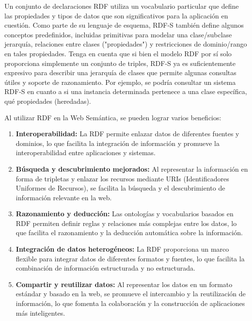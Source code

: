 \documentclass[12pt]{article}
\begin{document}
Un conjunto de declaraciones RDF utiliza un vocabulario particular que define las propiedades y tipos de datos que son significativos para la aplicación en cuestión. Como parte de su lenguaje de esquema, RDF-S también define algunos conceptos predefinidos, incluidas primitivas para modelar una clase/subclase jerarquía, relaciones entre clases ("propiedades") y restricciones de dominio/rango en tales propiedades. Tenga en cuenta que si bien el modelo RDF por sí solo proporciona simplemente un conjunto de triples, RDF-S ya es suficientemente expresivo para describir una jerarquía de clases que permite algunas consultas útiles y soporte de razonamiento. Por ejemplo, se podría consultar un sistema RDF-S en cuanto a si una instancia determinada pertenece a una clase específica, qué propiedades (heredadas). \citep{ref10}

Al utilizar RDF en la Web Semántica, se pueden lograr varios beneficios:
\citep{ref46}
\begin{enumerate}
    \item {
        
        \textbf{Interoperabilidad:} La RDF permite enlazar datos de diferentes fuentes y dominios, lo que facilita la integración de información y promueve la interoperabilidad entre aplicaciones y sistemas.
    }
    \item {
       
        \textbf{Búsqueda y descubrimiento mejorados:} Al representar la información en forma de tripletas y enlazar los recursos mediante URIs (Identificadores Uniformes de Recursos), se facilita la búsqueda y el descubrimiento de información relevante en la web.
    }
    \item {
        \textbf{Razonamiento y deducción:} Las ontologías y vocabularios basados en RDF permiten definir reglas y relaciones más complejas entre los datos, lo que facilita el razonamiento y la deducción automática sobre la información.
    }
    \item {
        \textbf{Integración de datos heterogéneos:} La RDF proporciona un marco flexible para integrar datos de diferentes formatos y fuentes, lo que facilita la combinación de información estructurada y no estructurada.
    }
    \item {
        \textbf{Compartir y reutilizar datos:} Al representar los datos en un formato estándar y basado en la web, se promueve el intercambio y la reutilización de información, lo que fomenta la colaboración y la construcción de aplicaciones más inteligentes.
    }
        
\end{enumerate}
\end{document}
